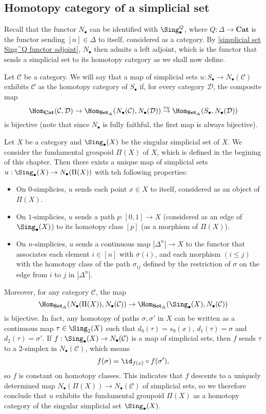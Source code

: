 \subsection{Homotopy category of a simplicial set}
Recall that the functor $N_\bullet$ can be identified with $\Sing_\bullet^Q$, where $Q:\Delta\to\mathbf{Cat}$ is the functor sending $[n]\in\Delta$ to itself, considered as a category. By \cref{simplicial set Sing^Q functor adjoint}, $N_\bullet$ then admits a left adjoint, which is the functor that sends a simplicial set to its homotopy category as we shall now define.\par
Let $\mathcal{C}$ be a category. We will say that a map of simplicial sets $u:S_\bullet\to N_\bullet(\mathcal{C})$ exhibits $\mathcal{C}$ as the homotopy category of $S_\bullet$ if, for every category $\mathcal{D}$, the composite map
\[\Hom_{\mathbf{Cat}}(\mathcal{C},\mathcal{D})\to\Hom_{\mathbf{Set}_\Delta}(N_\bullet(\mathcal{C}),N_\bullet(\mathcal{D}))\stackrel{\circ u}{\to}\Hom_{\mathbf{Set}_\Delta}(S_\bullet,N_\bullet(\mathcal{D}))\]
is bijective (note that since $N_\bullet$ is fully faithful, the first map is always bijective).
\begin{example}
Let $X$ be a category and $\Sing_\bullet(X)$ be the singular simplicial set of $X$. We consider the fundamental groupoid $\Pi(X)$ of $X$, which is defined in the begining of this chapter. Then there exists a unique map of simplicial sets $u:\Sing_\bullet(X)\to N_\bullet(\Pi(X))$ with teh following properties:
\begin{itemize}
\item On $0$-simplicies, $u$ sends each point $x\in X$ to itself, considered as an object of $\Pi(X)$.
\item On $1$-simplicies, $u$ sends a path $p:[0,1]\to X$ (considered as an edge of $\Sing_\bullet(X)$) to its homotopy class $[p]$ (as a morphism of $\Pi(X)$).
\item On $n$-simplicies, $u$ sends a continuous map $|\Delta^n|\to X$ to the functor that associates each element $i\in[n]$ with $\sigma(i)$, and each morphism $(i\leq j)$ with the homotopy class of the path $\sigma_{ij}$ defined by the restriction of $\sigma$ on the edge from $i$ to $j$ in $|\Delta^n|$.
\end{itemize}\label{simplicial set Sing(X) homotopy cat is Pi(X)}
Moreover, for any category $\mathcal{C}$, the map
\[\Hom_{\mathbf{Set}_\Delta}(N_\bullet(\Pi(X)),N_\bullet(\mathcal{C}))\to\Hom_{\mathbf{Set}_\Delta}(\Sing_\bullet(X),N_\bullet(\mathcal{C}))\]
is bijective. In fact, any homotopy of paths $\sigma,\sigma'$ in $X$ can be written as a continuous map $\tau\in\Sing_2(X)$ such that $d_0(\tau)=s_0(x)$, $d_1(\tau)=\sigma$ and $d_2(\tau)=\sigma'$. If $f:\Sing_\bullet(X)\to N_\bullet(\mathcal{C})$ is a map of simplicial sets, then $f$ sends $\tau$ to a $2$-simplex in $N_\bullet(\mathcal{C})$, which means
\[f(\sigma)=\id_{f(x)}\circ f(\sigma'),\]
so $f$ is constant on homotopy classes. This indicates that $f$ descents to a uniquely determined map $N_\bullet(\Pi(X))\to N_\bullet(\mathcal{C})$ of simplicial sets, so we therefore conclude that $u$ exhibits the fundamental groupoid $\Pi(X)$ as a homotopy category of the singular simplicial set $\Sing_\bullet(X)$.
\end{example}
